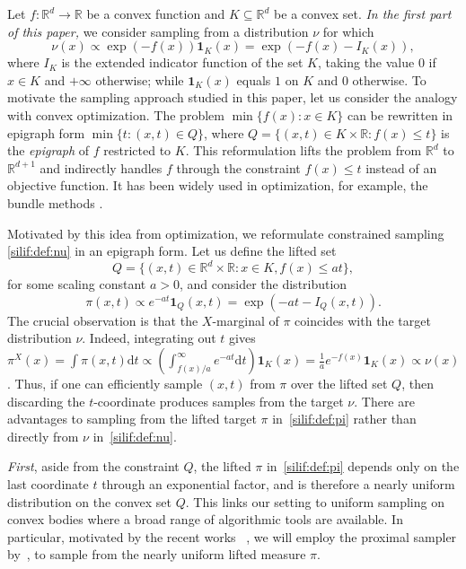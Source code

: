 \documentclass[11pt,letterpaper]{article}
\begin{document}
Let $f : \mathbb{R}^d \to \mathbb{R}$ be a convex function and $K \subseteq \mathbb{R}^d$ be a convex set. \emph{In the first part of this paper,} we consider sampling from a distribution $\nu$ for which
\begin{equation}
\label{silif:def:nu}
\nu(x) \propto \exp(-f(x)) \mathbf{1}_K(x) = \exp \left(-f(x) - I_K(x)\right),
\end{equation}
where $I_K$ is the extended indicator function of the set $K$, taking the value $0$ if $x \in K$ and $+\infty$ otherwise; while $ \mathbf{1}_K(x)$ equals $1$ on $K$ and $0$ otherwise. To motivate the sampling approach studied in this paper, let us consider the analogy with convex optimization. The problem $\min\{f(x): x\in K\}$ can be rewritten in epigraph form $\min \{t: (x,t) \in Q\}$,
where $Q = \{(x,t) \in K \times \mathbb{R} : f(x) \le t\}$ is the \emph{epigraph} of $f$ restricted to $K$. 
This reformulation lifts the problem from $\mathbb{R}^d$ to $\mathbb{R}^{d+1}$ and indirectly handles $f$ through the constraint $f(x) \leq t$ instead of an objective function. It has been widely used in optimization, for example, the bundle methods \cite{lemarechal1975extension,lemarechal1995new,wolfe1975method}. 

Motivated by this idea from optimization, we reformulate constrained sampling \eqref{silif:def:nu} in an epigraph form. Let us define the lifted set
\begin{equation}\label{silif:def:Q}
    Q = \{(x,t) \in \mathbb{R}^d \times \mathbb{R} : x \in K,   f(x) \le a t\},
\end{equation}
for some scaling constant $a > 0$, and consider the distribution
\begin{equation}
\label{silif:def:pi}
\pi(x,t) \propto e^{-a t} \mathbf{1}_Q(x,t) = \exp(-at-I_Q(x,t)).
\end{equation}
The crucial observation is that the $X$-marginal of $\pi$ coincides with the target distribution $\nu$.
Indeed, integrating out $t$ gives $\pi^X(x)=\int \pi(x,t) \mathrm{d}t \propto \left(\int_{f(x)/a}^{\infty} e^{-at} \mathrm{d}t\right)\mathbf{1}_K(x)=\frac{1}{a}e^{-f(x)}\mathbf{1}_K(x)\propto\nu(x)$. Thus, if one can efficiently sample $(x,t)$ from $\pi$ over the lifted set $Q$, then discarding the $t$-coordinate produces samples from the target $\nu$. There are advantages to sampling from the lifted target $\pi$ in~\eqref{silif:def:pi} rather than directly from $\nu$ in~\eqref{silif:def:nu}.


    \textit{First}, aside from the constraint $Q$, the lifted $\pi$ in~\eqref{silif:def:pi} depends only on the last coordinate $t$ through an exponential factor, and is therefore a nearly uniform distribution on the convex set $Q$. This links our setting to uniform sampling on convex bodies where a broad range of algorithmic tools are available. In particular, motivated by the recent works ~\cite{dangliang2025oracle,kook2024inandout}, we will employ the proximal sampler by~\cite{leestructured21}, to sample from the nearly uniform lifted measure $\pi$.
\end{document}
